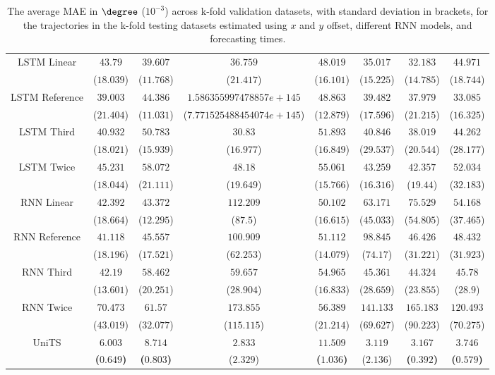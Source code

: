 \begin{table}[!ht]
{\begin{tabular}{|c|c|c|c|c|c|c|c|}
			\multirow{2}{*}{LSTM Linear} & $43.79$ & $39.607$ & $36.759$ & $48.019$ & $35.017$ & $32.183$ & $44.971$ \\
			 & ($18.039$) & ($11.768$) & ($21.417$) & ($16.101$) & ($15.225$) & ($14.785$) & ($18.744$) \\ \hline
			\multirow{2}{*}{LSTM Reference} & $39.003$ & $44.386$ & $1.586355997478857e+145$ & $48.863$ & $39.482$ & $37.979$ & $33.085$ \\
			 & ($21.404$) & ($11.031$) & ($7.771525488454074e+145$) & ($12.879$) & ($17.596$) & ($21.215$) & ($16.325$) \\ \hline
			\multirow{2}{*}{LSTM Third} & $40.932$ & $50.783$ & $30.83$ & $51.893$ & $40.846$ & $38.019$ & $44.262$ \\
			 & ($18.021$) & ($15.939$) & ($16.977$) & ($16.849$) & ($29.537$) & ($20.544$) & ($28.177$) \\ \hline
			\multirow{2}{*}{LSTM Twice} & $45.231$ & $58.072$ & $48.18$ & $55.061$ & $43.259$ & $42.357$ & $52.034$ \\
			 & ($18.044$) & ($21.111$) & ($19.649$) & ($15.766$) & ($16.316$) & ($19.44$) & ($32.183$) \\ \hline
			\multirow{2}{*}{RNN Linear} & $42.392$ & $43.372$ & $112.209$ & $50.102$ & $63.171$ & $75.529$ & $54.168$ \\
			 & ($18.664$) & ($12.295$) & ($87.5$) & ($16.615$) & ($45.033$) & ($54.805$) & ($37.465$) \\ \hline
			\multirow{2}{*}{RNN Reference} & $41.118$ & $45.557$ & $100.909$ & $51.112$ & $98.845$ & $46.426$ & $48.432$ \\
			 & ($18.196$) & ($17.521$) & ($62.253$) & ($14.079$) & ($74.17$) & ($31.221$) & ($31.923$) \\ \hline
			\multirow{2}{*}{RNN Third} & $42.19$ & $58.462$ & $59.657$ & $54.965$ & $45.361$ & $44.324$ & $45.78$ \\
			 & ($13.601$) & ($20.251$) & ($28.904$) & ($16.833$) & ($28.659$) & ($23.855$) & ($28.9$) \\ \hline
			\multirow{2}{*}{RNN Twice} & $70.473$ & $61.57$ & $173.855$ & $56.389$ & $141.133$ & $165.183$ & $120.493$ \\
			 & ($43.019$) & ($32.077$) & ($115.115$) & ($21.214$) & ($69.627$) & ($90.223$) & ($70.275$) \\ \hline
			\multirow{2}{*}{UniTS} & $\mathbf{6.003}$ & $\mathbf{8.714}$ & $2.833$ & $\mathbf{11.509}$ & $3.119$ & $\mathbf{3.167}$ & $\mathbf{3.746}$ \\
			 & \textbf{(}$\mathbf{0.649}$\textbf{)} & \textbf{(}$\mathbf{0.803}$\textbf{)} & ($2.329$) & \textbf{(}$\mathbf{1.036}$\textbf{)} & ($2.136$) & \textbf{(}$\mathbf{0.392}$\textbf{)} & \textbf{(}$\mathbf{0.579}$\textbf{)} \\ \hline
		\end{tabular}
	}
	\caption{The average MAE in $\degree$ ($10^{-3}$) across k-fold validation datasets, with standard deviation in brackets, for the trajectories in the k-fold testing datasets estimated using $x$ and $y$ offset, different RNN models, and forecasting times.}
	\label{tab:all_no_abs_MAE}
\end{table}